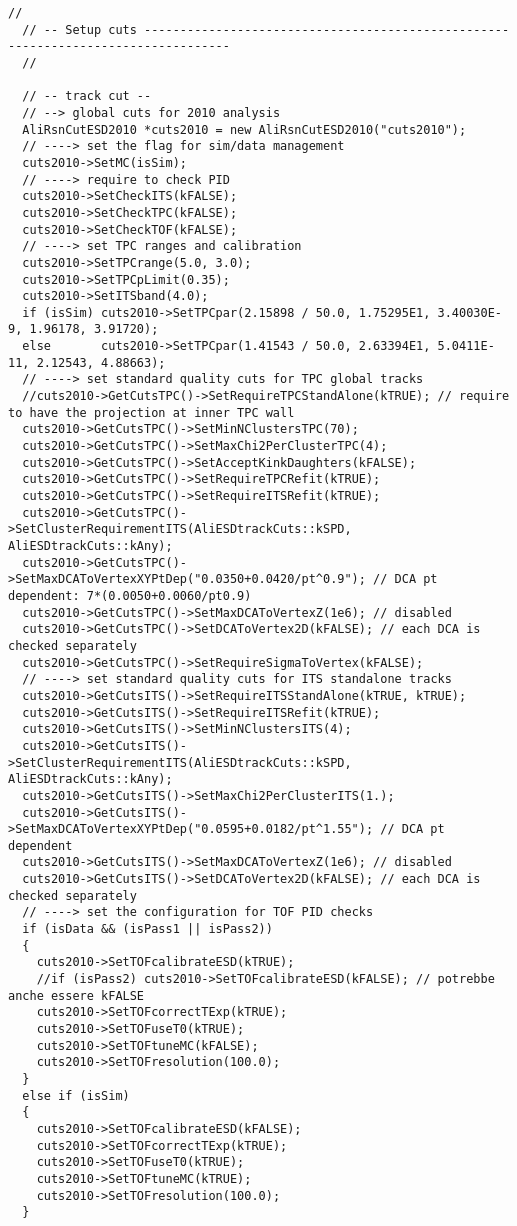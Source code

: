 \documentclass[12pt,a4paper]{article}
\begin{document}
\begin{lstlisting}[frame=single]
  //
  // -- Setup cuts ----------------------------------------------------------------------------------
  //
  
  // -- track cut --
  // --> global cuts for 2010 analysis
  AliRsnCutESD2010 *cuts2010 = new AliRsnCutESD2010("cuts2010");
  // ----> set the flag for sim/data management
  cuts2010->SetMC(isSim);
  // ----> require to check PID
  cuts2010->SetCheckITS(kFALSE);
  cuts2010->SetCheckTPC(kFALSE);
  cuts2010->SetCheckTOF(kFALSE);
  // ----> set TPC ranges and calibration
  cuts2010->SetTPCrange(5.0, 3.0);
  cuts2010->SetTPCpLimit(0.35);
  cuts2010->SetITSband(4.0);
  if (isSim) cuts2010->SetTPCpar(2.15898 / 50.0, 1.75295E1, 3.40030E-9, 1.96178, 3.91720);
  else       cuts2010->SetTPCpar(1.41543 / 50.0, 2.63394E1, 5.0411E-11, 2.12543, 4.88663);
  // ----> set standard quality cuts for TPC global tracks
  //cuts2010->GetCutsTPC()->SetRequireTPCStandAlone(kTRUE); // require to have the projection at inner TPC wall
  cuts2010->GetCutsTPC()->SetMinNClustersTPC(70);
  cuts2010->GetCutsTPC()->SetMaxChi2PerClusterTPC(4);
  cuts2010->GetCutsTPC()->SetAcceptKinkDaughters(kFALSE);
  cuts2010->GetCutsTPC()->SetRequireTPCRefit(kTRUE);
  cuts2010->GetCutsTPC()->SetRequireITSRefit(kTRUE);
  cuts2010->GetCutsTPC()->SetClusterRequirementITS(AliESDtrackCuts::kSPD, AliESDtrackCuts::kAny);
  cuts2010->GetCutsTPC()->SetMaxDCAToVertexXYPtDep("0.0350+0.0420/pt^0.9"); // DCA pt dependent: 7*(0.0050+0.0060/pt0.9)
  cuts2010->GetCutsTPC()->SetMaxDCAToVertexZ(1e6); // disabled
  cuts2010->GetCutsTPC()->SetDCAToVertex2D(kFALSE); // each DCA is checked separately
  cuts2010->GetCutsTPC()->SetRequireSigmaToVertex(kFALSE);
  // ----> set standard quality cuts for ITS standalone tracks
  cuts2010->GetCutsITS()->SetRequireITSStandAlone(kTRUE, kTRUE);
  cuts2010->GetCutsITS()->SetRequireITSRefit(kTRUE);
  cuts2010->GetCutsITS()->SetMinNClustersITS(4);
  cuts2010->GetCutsITS()->SetClusterRequirementITS(AliESDtrackCuts::kSPD, AliESDtrackCuts::kAny);
  cuts2010->GetCutsITS()->SetMaxChi2PerClusterITS(1.);
  cuts2010->GetCutsITS()->SetMaxDCAToVertexXYPtDep("0.0595+0.0182/pt^1.55"); // DCA pt dependent
  cuts2010->GetCutsITS()->SetMaxDCAToVertexZ(1e6); // disabled
  cuts2010->GetCutsITS()->SetDCAToVertex2D(kFALSE); // each DCA is checked separately
  // ----> set the configuration for TOF PID checks
  if (isData && (isPass1 || isPass2))
  {
    cuts2010->SetTOFcalibrateESD(kTRUE);
    //if (isPass2) cuts2010->SetTOFcalibrateESD(kFALSE); // potrebbe anche essere kFALSE
    cuts2010->SetTOFcorrectTExp(kTRUE);
    cuts2010->SetTOFuseT0(kTRUE);
    cuts2010->SetTOFtuneMC(kFALSE);
    cuts2010->SetTOFresolution(100.0);
  }
  else if (isSim)
  {
    cuts2010->SetTOFcalibrateESD(kFALSE);
    cuts2010->SetTOFcorrectTExp(kTRUE);
    cuts2010->SetTOFuseT0(kTRUE);
    cuts2010->SetTOFtuneMC(kTRUE);
    cuts2010->SetTOFresolution(100.0);
  }
  

\end{lstlisting}
\end{document}
